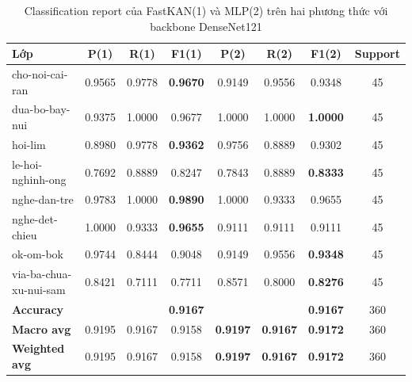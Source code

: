 \begin{table}[H]
\centering
\renewcommand{\arraystretch}{1.08}
\caption{\centering Classification report của FastKAN(1) và MLP(2) trên hai phương thức với backbone DenseNet121}
\begin{tabular}{lccccccc}
\hline \textbf{Lớp} & \textbf{P(1)} & \textbf{R(1)} & \textbf{F1(1)} & \textbf{P(2)} & \textbf{R(2)} & \textbf{F1(2)} & \textbf{Support} \\ \hline

cho-noi-cai-ran
& 0.9565 & 0.9778 & \textbf{0.9670} 
& 0.9149 & 0.9556 & 0.9348 & 45 \\

dua-bo-bay-nui 
& 0.9375 & 1.0000 & 0.9677 
& 1.0000 & 1.0000 & \textbf{1.0000} & 45 \\

hoi-lim 
& 0.8980 & 0.9778 & \textbf{0.9362} 
& 0.9756 & 0.8889 & 0.9302 & 45 \\

le-hoi-nghinh-ong
& 0.7692 & 0.8889 & 0.8247 
& 0.7843 & 0.8889 & \textbf{0.8333} & 45 \\

nghe-dan-tre
& 0.9783 & 1.0000 & \textbf{0.9890} 
& 1.0000 & 0.9333 & 0.9655 & 45 \\

nghe-det-chieu 
& 1.0000 & 0.9333 & \textbf{0.9655} 
& 0.9111 & 0.9111 & 0.9111 & 45 \\

ok-om-bok
& 0.9744 & 0.8444 & 0.9048 
& 0.9149 & 0.9556 & \textbf{0.9348} & 45 \\

via-ba-chua-xu-nui-sam
& 0.8421 & 0.7111 & 0.7711 
& 0.8571 & 0.8000 & \textbf{0.8276} & 45 \\
\hline

\textbf{Accuracy}
& & & \textbf{0.9167}
& & & \textbf{0.9167} & 360 \\

\textbf{Macro avg} 
& 0.9195 & 0.9167 & 0.9158 
& \textbf{0.9197} & \textbf{0.9167} & \textbf{0.9172} & 360 \\

\textbf{Weighted avg}
& 0.9195 & 0.9167 & 0.9158 
& \textbf{0.9197} & \textbf{0.9167} & \textbf{0.9172} & 360 \\
\hline
\end{tabular}
\end{table}

